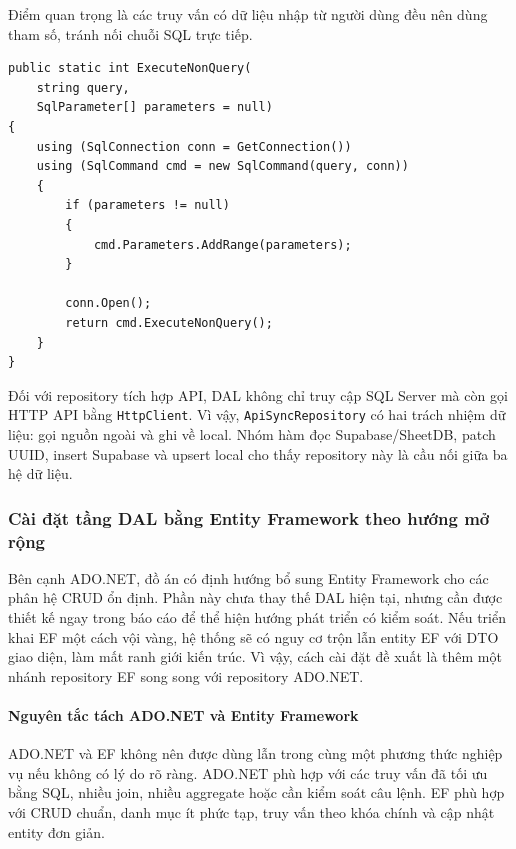 \documentclass[12pt,a4paper]{article}
\numberwithin{figure}{subsection}
\numberwithin{table}{subsection}
\newcounter{codecounter}
\newenvironment{codeblock}[2]{%
    \refstepcounter{codecounter}%
    \phantomsection%
    \label{#1}%
    \par\smallskip
}{%
    \par\smallskip
}
\begin{document}
Điểm quan trọng là các truy vấn có dữ liệu nhập từ người dùng đều nên dùng tham số, tránh nối chuỗi SQL trực tiếp.

\begin{codeblock}{code:database-helper-real}{DatabaseHelper dùng ADO.NET}
\begin{verbatim}
public static int ExecuteNonQuery(
    string query,
    SqlParameter[] parameters = null)
{
    using (SqlConnection conn = GetConnection())
    using (SqlCommand cmd = new SqlCommand(query, conn))
    {
        if (parameters != null)
        {
            cmd.Parameters.AddRange(parameters);
        }

        conn.Open();
        return cmd.ExecuteNonQuery();
    }
}
\end{verbatim}
\end{codeblock}

Đối với repository tích hợp API, DAL không chỉ truy cập SQL Server mà còn gọi HTTP API bằng \texttt{HttpClient}. Vì vậy, \texttt{ApiSyncRepository} có hai trách nhiệm dữ liệu: gọi nguồn ngoài và ghi về local. Nhóm hàm đọc Supabase/SheetDB, patch UUID, insert Supabase và upsert local cho thấy repository này là cầu nối giữa ba hệ dữ liệu.

\subsubsection{Cài đặt tầng DAL bằng Entity Framework theo hướng mở rộng}

Bên cạnh ADO.NET, đồ án có định hướng bổ sung Entity Framework cho các phân hệ CRUD ổn định. Phần này chưa thay thế DAL hiện tại, nhưng cần được thiết kế ngay trong báo cáo để thể hiện hướng phát triển có kiểm soát. Nếu triển khai EF một cách vội vàng, hệ thống sẽ có nguy cơ trộn lẫn entity EF với DTO giao diện, làm mất ranh giới kiến trúc. Vì vậy, cách cài đặt đề xuất là thêm một nhánh repository EF song song với repository ADO.NET.

\paragraph{Nguyên tắc tách ADO.NET và Entity Framework}

ADO.NET và EF không nên được dùng lẫn trong cùng một phương thức nghiệp vụ nếu không có lý do rõ ràng. ADO.NET phù hợp với các truy vấn đã tối ưu bằng SQL, nhiều join, nhiều aggregate hoặc cần kiểm soát câu lệnh. EF phù hợp với CRUD chuẩn, danh mục ít phức tạp, truy vấn theo khóa chính và cập nhật entity đơn giản.
\end{document}
